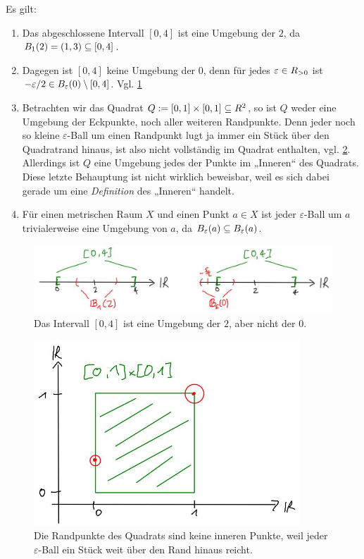 \begin{bsp}
    Es gilt:
    \begin{enumerate}
        \item Das abgeschlossene Intervall $[0,4]$ ist eine Umgebung der $2$, da $\relax B_1(2)=(1,3)\subseteq [0,4]$.
        \item Dagegen ist $[0,4]$ keine Umgebung der $0$, denn für jedes $\varepsilon\in\relax R_{>0}$ ist $-\varepsilon/2 \in \relax B_\varepsilon(0)\setminus [0,4]$. Vgl. \cref{fig:intervallumgebung}
        \item Betrachten wir das Quadrat $Q:=[0,1]\times [0,1]\subseteq \relax R^2$, so ist $Q$ weder eine Umgebung der Eckpunkte, noch aller weiteren Randpunkte. Denn jeder noch so kleine $\varepsilon$-Ball um einen Randpunkt lugt ja immer ein Stück über den Quadratrand hinaus, ist also nicht vollständig im Quadrat enthalten, vgl. \cref{fig:quadratumgebung}. Allerdings ist $Q$ eine Umgebung jedes der Punkte im „Inneren“ des Quadrats. Diese letzte Behauptung ist nicht wirklich beweisbar, weil es sich dabei gerade um eine \emph{Definition} des „Inneren“ handelt.
        \item Für einen metrischen Raum $X$ und einen Punkt $a\in X$ ist jeder $\varepsilon$-Ball um $a$ trivialerweise eine Umgebung von $a$, da $\relax B_\varepsilon(a)\subseteq\relax B_\varepsilon(a)$.
    \end{enumerate}
    \begin{figure}[p]
        \includegraphics[width=\textwidth]{./_img/Intervallpunkte.jpeg}
        \centering \caption{Das Intervall $[0,4]$ ist eine Umgebung der $2$, aber nicht der $0$.}
        \label{fig:intervallumgebung}
    \end{figure}
    \begin{figure}[p]
        \includegraphics[width=10cm]{./_img/Quadratpunkte.jpeg}
        \centering \caption{Die Randpunkte des Quadrats sind keine inneren Punkte, weil jeder $\varepsilon$-Ball ein Stück weit über den Rand hinaus reicht.}
        \label{fig:quadratumgebung}
    \end{figure}
\end{bsp}


